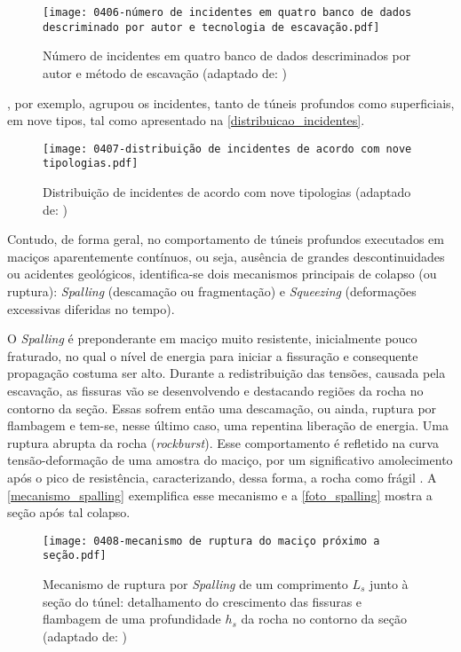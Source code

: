 \begin{figure}[H]
	\begin{center}
		\texttt{[image: 0406-número de incidentes em quatro banco de dados descriminado por autor e tecnologia de escavação.pdf]}
	\end{center}
	\caption{\label{incidentes}Número de incidentes em quatro banco de dados descriminados por autor e método de escavação (adaptado de: )}
\end{figure}

, por exemplo, agrupou os incidentes, tanto de túneis profundos como superficiais, em nove tipos, tal como apresentado na \autoref{distribuicao_incidentes}.

\begin{figure}[H]
	\begin{center}
		\texttt{[image: 0407-distribuição de incidentes de acordo com nove tipologias.pdf]}
	\end{center}
	\caption{\label{distribuicao_incidentes}Distribuição de incidentes de acordo com nove tipologias (adaptado de: )}
\end{figure}

Contudo, de forma geral, no comportamento de túneis profundos executados em maciços aparentemente contínuos, ou seja, ausência de grandes descontinuidades ou acidentes geológicos, identifica-se dois mecanismos principais de colapso (ou ruptura): \textit{Spalling} (descamação ou fragmentação) e \textit{Squeezing} (deformações excessivas diferidas no tempo).

O \textit{Spalling} é preponderante em maciço muito resistente, inicialmente pouco fraturado, no qual o nível de energia para iniciar a fissuração e consequente propagação costuma ser alto. Durante a redistribuição das tensões, causada pela escavação, as fissuras vão se desenvolvendo e destacando regiões da rocha no contorno da seção. Essas sofrem então uma descamação, ou ainda, ruptura por flambagem e tem-se, nesse último caso, uma repentina liberação de energia. Uma ruptura abrupta da rocha (\textit{rockburst}). Esse comportamento é refletido na curva tensão-deformação de uma amostra do maciço, por um significativo amolecimento após o pico de resistência, caracterizando, dessa forma, a rocha como frágil \cite[p. 83]{Kleine2007}. A \autoref{mecanismo_spalling} exemplifica esse mecanismo e a \autoref{foto_spalling} mostra a seção após tal colapso.

\begin{figure}[H]
	\begin{center}
		\texttt{[image: 0408-mecanismo de ruptura do maciço próximo a seção.pdf]}
	\end{center}
	\caption{\label{mecanismo_spalling}Mecanismo de ruptura por \textit{Spalling} de um comprimento $L_s$ junto à seção do túnel: detalhamento do crescimento das fissuras e flambagem de uma profundidade $h_s$ da rocha no contorno da seção (adaptado de: )}
\end{figure}

